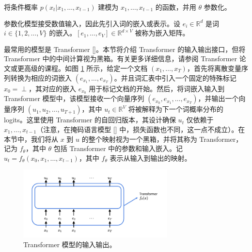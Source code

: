 将条件概率 $p(x_t|x_1, \dots, x_{t-1})$ 建模为 $x_1, \dots, x_{t-1}$ 的函数，并用 $\theta$ 参数化。

参数化模型接受数值输入，因此先引入词的嵌入或表示。设 $e_i \in \mathbb{R}^d$ 是词 $i \in \{1, 2, \dots, V\}$ 的嵌入。$[e_1, \dots, e_V] \in \mathbb{R}^{d \times V}$ 被称为嵌入矩阵。

最常用的模型是 Transformer [\cite{vaswani2017attention}]。本节将介绍 Transformer 的输入输出接口，但将 Transformer 中的中间计算视为黑箱。有关更多详细信息，请参阅 Transformer 论文或更高级的课程。如图 \ref{fig:14.1} 所示，给定一个文档 $(x_1, \dots, x_T)$，首先将离散变量序列转换为相应的词嵌入 $(e_{x_1}, \dots, e_{x_T})$。并且词汇表中引入一个固定的特殊标记 $x_0 = \perp$，其对应的嵌入 $e_{x_0}$ 用于标记文档的开始。然后，将词嵌入输入到 Transformer 模型中，该模型接收一个向量序列 $(e_{x_0}, e_{x_1}, \dots, e_{x_T})$，并输出一个向量序列 $(u_1, u_2, \dots, u_{T+1})$，其中 $u_t \in \mathbb{R}^V$ 将被解释为下一个词概率分布的 logits。这里使用 Transformer 的自回归版本，其设计确保 $u_t$ 仅依赖于 $x_1, \dots, x_{t-1}$（注意，在掩码语言模型 [\cite{devlin2019bert}] 中，损失函数也不同，这一点不成立）。在本节中，我们将从 $x$ 到 $u$ 的整个映射视为一个黑箱，并将其称为 Transformer，记为 $f_\theta$，其中 $\theta$ 包括 Transformer 中的参数和输入嵌入。记 $u_t = f_\theta(x_0, x_1, \dots, x_{t-1})$，其中 $f_\theta$ 表示从输入到输出的映射。

\begin{figure}
    \centering
    \includegraphics[width=0.7\textwidth]{figs/transformer.pdf}
    \caption{Transformer 模型的输入输出。}
    \label{fig:14.1}
\end{figure}


